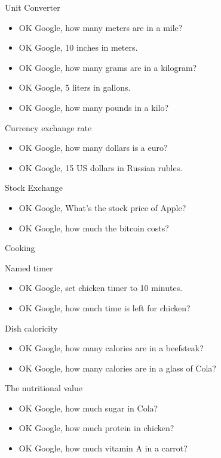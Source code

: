 \documentclass[
  a4paper,
]{article}
\providecommand{\tightlist}{%
  \setlength{\itemsep}{0pt}\setlength{\parskip}{0pt}}\usepackage{longtable,booktabs,array}
\begin{document}
Unit Converter

\begin{itemize}
\tightlist
\item
  OK Google, how many meters are in a mile?
\item
  OK Google, 10 inches in meters.
\item
  OK Google, how many grams are in a kilogram?
\item
  OK Google, 5 liters in gallons.
\item
  OK Google, how many pounds in a kilo?
\end{itemize}

Currency exchange rate

\begin{itemize}
\tightlist
\item
  OK Google, how many dollars is a euro?
\item
  OK Google, 15 US dollars in Russian rubles.
\end{itemize}

Stock Exchange

\begin{itemize}
\tightlist
\item
  OK Google, What's the stock price of Apple?
\item
  OK Google, how much the bitcoin costs?
\end{itemize}

Cooking

Named timer

\begin{itemize}
\tightlist
\item
  OK Google, set chicken timer to 10 minutes.
\item
  OK Google, how much time is left for chicken?
\end{itemize}

Dish caloricity

\begin{itemize}
\tightlist
\item
  OK Google, how many calories are in a beefsteak?
\item
  OK Google, how many calories are in a glass of Cola?
\end{itemize}

The nutritional value

\begin{itemize}
\tightlist
\item
  OK Google, how much sugar in Cola?
\item
  OK Google, how much protein in chicken?
\item
  OK Google, how much vitamin A in a carrot?
\end{itemize}
\end{document}
